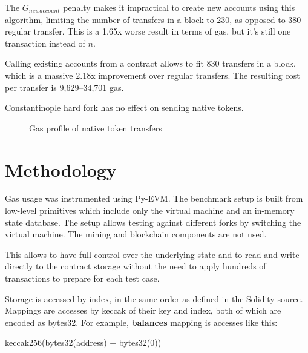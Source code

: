 \documentclass[12pt]{article}
\begin{document}
The $G_{newaccount}$ penalty makes it impractical to create new accounts using this algorithm, limiting the number of transfers in a block to 230, as opposed to 380 regular transfer.
This is a 1.65x worse result in terms of gas, but it's still one transaction instead of $n$.

Calling existing accounts from a contract allows to fit 830 transfers in a block, which is a massive 2.18x improvement over regular transfers.
The resulting cost per transfer is 9,629--34,701 gas.

Constantinople hard fork has no effect on sending native tokens.

\begin{figure}[h!]
\caption{Gas profile of native token transfers}
\end{figure}


\section{Methodology}

Gas usage was instrumented using Py-EVM\cite{pyevm}.
The benchmark setup is built from low-level primitives which include only the virtual machine and an in-memory state database.
The setup allows testing against different forks by switching the virtual machine.
The mining and blockchain components are not used.

This allows to have full control over the underlying state and to read and write directly to the contract storage without the need to apply hundreds of transactions to prepare for each test case.

Storage is accessed by index, in the same order as defined in the Solidity source.
Mappings are accesses by keccak of their key and index, both of which are encoded as bytes32.
For example, \textbf{balances} mapping is accesses like this:
\begin{center}
	keccak256(bytes32(address) + bytes32(0))	
\end{center}
\end{document}
